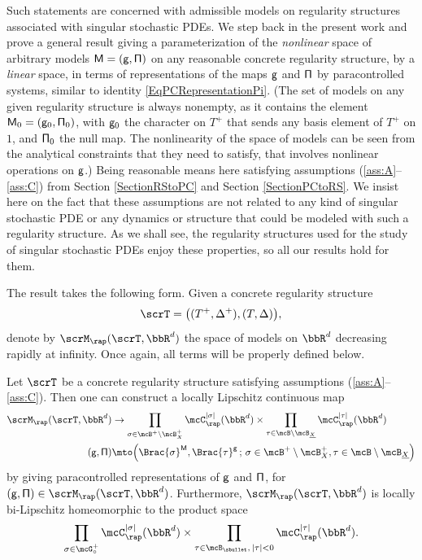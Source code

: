Such statements are concerned with admissible models on regularity structures associated with singular stochastic PDEs. We step back in the present work and prove a general result giving a parameterization of the \emph{nonlinear} space of arbitrary models $\sf M=(g,\Pi)$ on any reasonable concrete regularity structure, by a \emph{linear} space, in terms of representations of the maps $\sf g$ and $\sf \Pi$ by paracontrolled systems, similar to identity \eqref{EqPCRepresentationPi}. (The set of models on any given regularity structure is always nonempty, as it contains the element ${\sf M}_0 = ({\sf g}_0, {\sf \Pi}_0)$, with ${\sf g}_0$ the character on $T^+$ that sends any basis element of $T^+$ on $1$, and ${\sf \Pi}_0$ the null map. The nonlinearity of the space of models can be seen from the analytical constraints that they need to satisfy, that involves nonlinear operations on $\sf g$.) Being reasonable means here satisfying assumptions \hbox{(\ref{ass:A}--\ref{ass:C})} from Section \ref{SectionRStoPC} and Section \ref{SectionPCtoRS}. We insist here on the fact that these assumptions are not related to any kind of singular stochastic PDE or any dynamics or structure that could be modeled with such a regularity structure. As we shall see, the regularity structures used for the study of singular stochastic PDEs enjoy these properties, so all our results hold for them.

The result takes the following form. Given a concrete regularity structure
\[
\scrT=\bigl((T^+,\Delta^+), (T,\Delta)\bigr),
\]
denote by $\scrM_\rap(\scrT, \bbR^d)$ the space of models on $\bbR^d$ decreasing rapidly at infinity. Once again, all terms will be properly defined below.

\begin{thm}\label{mainthm1}
Let $\scrT$ be a concrete regularity structure satisfying assumptions \textup{(\ref{ass:A}--\ref{ass:C})}. Then one can construct a locally Lipschitz continuous map
\begin{equation} \begin{split} \label{EqMapModelsToRemainders}
\scrM_\rap(\scrT, \bbR^d) &\to
\prod_{\sigma\in\mcB^+\setminus\mcB_X^+} \mcC_\rap^{|\sigma|}(\bbR^d) \times \prod_{\tau\in\mcB\setminus\mcB_{\underline{X}}} \mcC_\rap^{|\tau|}(\bbR^d) \\
{\sf (g,\Pi)} &\mto \Bigl(\Brac{\sigma}^{\sf M}, \Brac{\tau}^{\sf g}\,;\, \sigma\in\mcB^+\setminus\mcB_X^+, \tau\in\mcB\setminus\mcB_{\underline{X}} \Bigr)
\end{split} \end{equation}
by giving paracontrolled representations of $\sf g$ and $\sf \Pi$, for $({\sf g}, {\sf \Pi})\in \scrM_\rap(\scrT, \bbR^d)$. Furthermore, $\scrM_\rap(\scrT, \bbR^d)$ is locally bi-Lipschitz homeomorphic to the product space
\begin{align} \label{EqParametrizationThm1}
\prod_{\sigma\in\mcG_\circ^+} \mcC_\rap^{|\sigma|}(\bbR^d) \times \prod_{\tau\in\mcB_\sbullet,\,|\tau|<0} \mcC_\rap^{|\tau|}(\bbR^d).
\end{align}
\end{thm}

